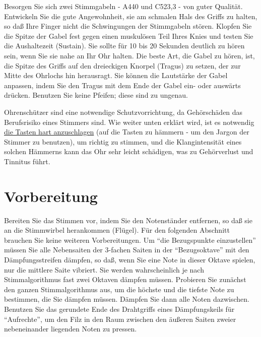 \hypertarget{c2_3_gabel}{}

Besorgen Sie sich zwei Stimmgabeln - A440 und C523,3 - von guter Qualität.
Entwickeln Sie die gute Angewohnheit, sie am schmalen Hals des Griffs zu halten, so daß Ihre Finger nicht die Schwingungen der Stimmgabeln stören.
Klopfen Sie die Spitze der Gabel fest gegen einen muskulösen Teil Ihres Knies und testen Sie die Aushaltezeit (Sustain).
Sie sollte für 10 bis 20 Sekunden deutlich zu hören sein, wenn Sie sie nahe an Ihr Ohr halten.
Die beste Art, die Gabel zu hören, ist, die Spitze des Griffs auf den dreieckigen Knorpel (Tragus) zu setzen, der zur Mitte des Ohrlochs hin herausragt.
Sie können die Lautstärke der Gabel anpassen, indem Sie den Tragus mit dem Ende der Gabel ein- oder auswärts drücken.
Benutzen Sie keine Pfeifen; diese sind zu ungenau.

Ohrenschützer sind eine notwendige Schutzvorrichtung, da Gehörschäden das Berufsrisiko eines Stimmers sind.
Wie weiter unten erklärt wird, ist es notwendig \hyperref[c2_5_infi]{die Tasten hart anzuschlagen} (auf die Tasten zu hämmern - um den Jargon der Stimmer zu benutzen), um richtig zu stimmen, und die Klangintensität eines solchen Hämmerns kann das Ohr sehr leicht schädigen, was zu Gehörverlust und Tinnitus führt.
 

\chapter{Vorbereitung}
\label{c2_4}

Bereiten Sie das Stimmen vor, indem Sie den Notenständer entfernen, so daß sie an die Stimmwirbel herankommen (Flügel).
Für den folgenden Abschnitt brauchen Sie keine weiteren Vorbereitungen.
Um \enquote{die Bezugspunkte einzustellen} müssen Sie alle Nebensaiten der 3-fachen Saiten in der \enquote{Bezugsoktave} mit den Dämpfungsstreifen dämpfen, so daß, wenn Sie eine Note in dieser Oktave spielen, nur die mittlere Saite vibriert.
Sie werden wahrscheinlich je nach Stimmalgorithmus fast zwei Oktaven dämpfen müssen.
Probieren Sie zunächst den ganzen Stimmalgorithmus aus, um die höchste und die tiefste Note zu bestimmen, die Sie dämpfen müssen.
Dämpfen Sie dann alle Noten dazwischen.
Benutzen Sie das gerundete Ende des Drahtgriffs eines Dämpfungskeils für \enquote{Aufrechte}, um den Filz in den Raum zwischen den äußeren Saiten zweier nebeneinander liegenden Noten zu pressen.
 


